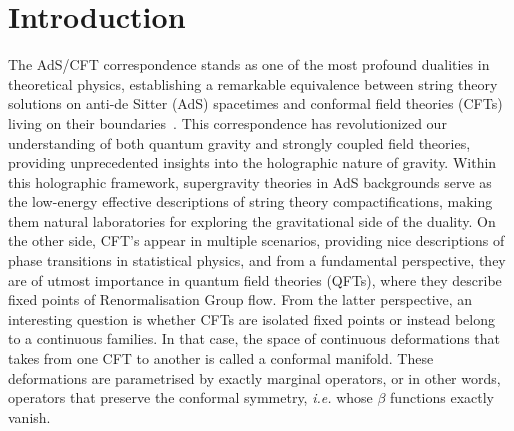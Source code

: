 \documentclass[11pt,a4paper]{article}
\begin{document}
\tableofcontents



\section{Introduction}

The AdS/CFT correspondence stands as one of the most profound dualities in theoretical physics, establishing a remarkable equivalence between string theory solutions on anti-de Sitter (AdS) spacetimes and conformal field theories (CFTs) living on their boundaries~\cite{Maldacena:1997re}. 
This correspondence has revolutionized our understanding of both quantum gravity and strongly coupled field theories, providing unprecedented insights into the holographic nature of gravity. 
Within this holographic framework, supergravity theories in AdS backgrounds serve as the low-energy effective descriptions of string theory compactifications, making them natural laboratories for exploring the gravitational side of the duality. On the other side, CFT’s appear in multiple scenarios, providing nice descriptions of phase transitions in statistical physics, and from a fundamental perspective, they are of utmost importance in quantum field theories (QFTs), where they describe fixed points of Renormalisation Group flow. 
From the latter perspective, an interesting question is  whether CFTs are isolated fixed points or instead belong to a continuous families. 
In that case, the space of continuous deformations that takes from one CFT to another is called a conformal manifold. 
These deformations are parametrised by exactly marginal operators, or in other words, operators that preserve the conformal symmetry, \textit{i.e.} whose $\beta$ functions exactly vanish.
\end{document}
